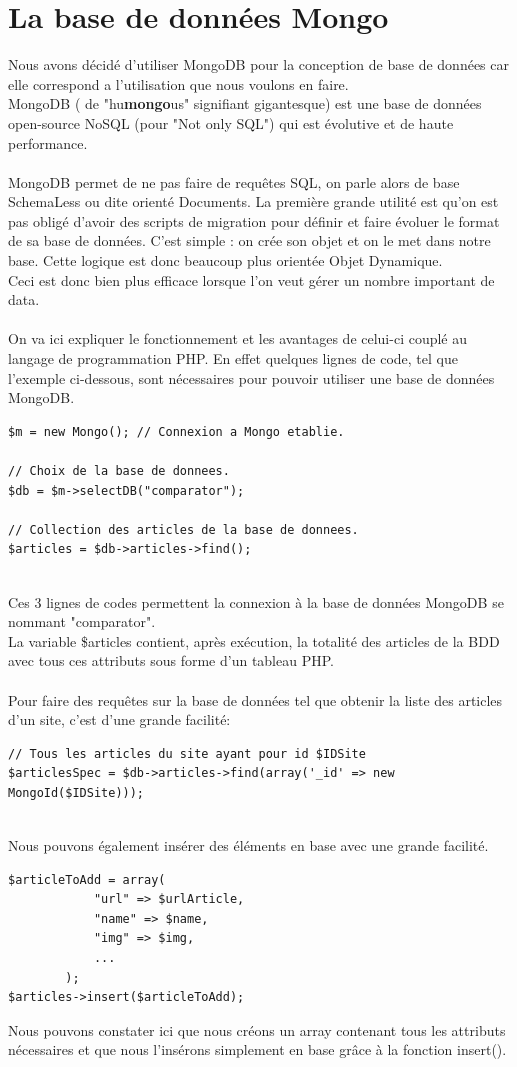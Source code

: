 \documentclass{report}
\begin{document}
\section{La base de données Mongo}
Nous avons décidé d'utiliser MongoDB pour la conception de base de données car elle correspond a l'utilisation que nous voulons en faire.\\
MongoDB ( de "hu\textbf{mongo}us" signifiant gigantesque) est une base de données open-source NoSQL (pour "Not only SQL") qui est évolutive et de haute performance.\\\\
MongoDB permet de ne pas faire de requêtes SQL, on parle alors de base SchemaLess ou dite orienté Documents.
La première grande utilité est qu'on est pas obligé d'avoir des scripts de migration pour définir et faire évoluer le format de sa base de données. C'est simple : on crée son objet et on le met dans notre base. Cette logique est donc beaucoup plus orientée Objet Dynamique.\\
Ceci est donc bien plus efficace lorsque l'on veut gérer un nombre important de data.\\\\
On va ici expliquer le fonctionnement et les avantages de celui-ci couplé au langage de programmation PHP.
En effet quelques lignes de code, tel que l'exemple ci-dessous, sont nécessaires pour pouvoir utiliser une base de données MongoDB.
\begin{lstlisting}
$m = new Mongo(); // Connexion a Mongo etablie.

// Choix de la base de donnees.
$db = $m->selectDB("comparator");

// Collection des articles de la base de donnees.
$articles = $db->articles->find();
\end{lstlisting}
~\\
Ces 3 lignes de codes permettent la connexion à la base de données MongoDB se nommant "comparator".\\
La variable \$articles contient, après exécution, la totalité des articles de la BDD avec tous ces attributs sous forme d'un tableau PHP.\\\\
Pour faire des requêtes sur la base de données tel que obtenir la liste des articles d'un site, c'est d'une grande facilité:
\begin{lstlisting}
// Tous les articles du site ayant pour id $IDSite
$articlesSpec = $db->articles->find(array('_id' => new MongoId($IDSite)));
\end{lstlisting}
~\\
Nous pouvons également insérer des éléments en base avec une grande facilité.
\begin{lstlisting}
$articleToAdd = array(
			"url" => $urlArticle,
			"name" => $name,
			"img" => $img, 
			...
		);
$articles->insert($articleToAdd);
\end{lstlisting}
Nous pouvons constater ici que nous créons un array contenant tous les attributs nécessaires et que nous l'insérons simplement en base grâce à la fonction insert().
\end{document}
